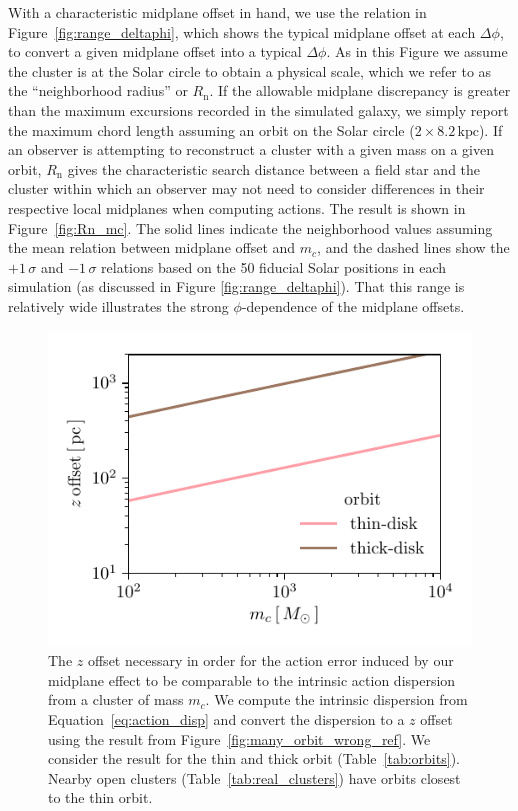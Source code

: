 \documentclass[twocolumn]{aastex62}
\newcommand{\kpc}{\text{kpc}}
\newcommand{\n}{\text{n}}
\begin{document}
With a characteristic midplane offset in hand, we use the relation in
Figure~\ref{fig:range_deltaphi}, which shows the typical midplane offset at
each $\Delta \phi$, to convert a given midplane offset into a typical
$\Delta\phi$. As in this Figure we assume the cluster is at the Solar circle
to obtain a physical scale, which we refer to as the ``neighborhood radius''
or $R_{\n}$. If the allowable midplane discrepancy is greater than the maximum
excursions recorded in the simulated galaxy, we simply report the maximum
chord length assuming an orbit on the Solar circle ($2\times8.2\,\kpc$). If an
observer is attempting to reconstruct a cluster with a given mass on a given
orbit, $R_{\n}$ gives the characteristic search distance between a field star
and the cluster within which an observer may not need to consider differences
in their respective local midplanes when computing actions. The result is
shown in Figure~\ref{fig:Rn_mc}. The solid lines indicate the neighborhood
values assuming the mean relation between midplane offset and $m_c$, and the
dashed lines show the $+1\,\sigma$ and $-1\,\sigma$ relations based on the 50
fiducial Solar positions in each simulation (as discussed in Figure
\ref{fig:range_deltaphi}). That this range is relatively wide illustrates the
strong $\phi$-dependence of the midplane offsets.

\begin{figure}
\begin{center}
\includegraphics[width=\columnwidth]{fig/cluster_offset.pdf}
\end{center}
\caption{The $z$ offset necessary in order for the action error induced by our
midplane effect to be comparable to the intrinsic action dispersion from a
cluster of mass $m_c$. We compute the intrinsic dispersion from
Equation~\ref{eq:action_disp} and convert the dispersion to a $z$ offset using
the result from Figure~\ref{fig:many_orbit_wrong_ref}. We consider the result
for the thin and thick orbit (Table~\ref{tab:orbits}). Nearby open clusters
(Table~\ref{tab:real_clusters}) have orbits closest to the thin orbit.}
\label{fig:cluster_offset}
\end{figure}
\end{document}
